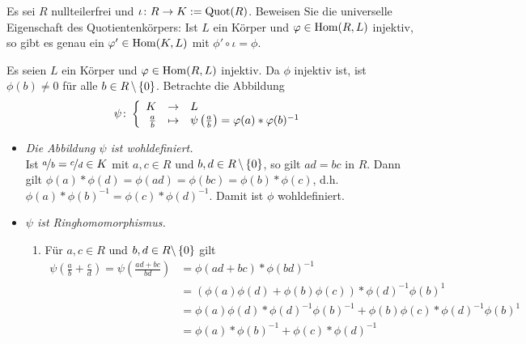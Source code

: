 \begin{exercisePage}
	\begin{exercise}
		Es sei $R$ nullteilerfrei und $\iota \colon R \to K:= \operatorname{Quot}(R)$. Beweisen Sie die universelle Eigenschaft des Quotientenkörpers: Ist $L$ ein Körper und $\varphi \in \operatorname{Hom}(R,L)$ injektiv, so gibt es genau ein $\varphi' \in \operatorname{Hom}(K,L)$ mit $\phi' \circ \iota = \phi$.
	\end{exercise}
	\begin{solution}
		Es seien $L$ ein Körper und $\varphi \in \operatorname{Hom}(R, L)$ injektiv. Da $\phi$ injektiv ist, ist $\phi(b) \neq 0$ für alle $b \in R\, \backslash \left\{ 0 \right\}$. Betrachte die Abbildung
		\begin{equation*}
			\psi \colon \left\lbrace \begin{array}{rcl} K & \to & L \\\frac{a}{b} & \mapsto & \psi \left(\frac{a}{b} \right) = \varphi(a) * \varphi(b)^{-1} \end{array} \right.
		\end{equation*}
		\begin{itemize}[leftmargin=*]
            \item \textit{Die Abbildung $\psi$ ist wohldefiniert.} \\
            Ist $\lfrac{a}{b} = \lfrac{c}{d} \in K$ mit $a,c \in R$ und $b,d \in R \, \backslash \left\{ 0 \right\}$, so gilt $ad = bc$ in $R$. Dann gilt $\phi(a) * \phi(d) = \phi(ad) = \phi(bc) = \phi(b) * \phi(c)$, d.h. $\phi(a) * \phi(b)^{-1} = \phi(c) * \phi(d)^{-1}$. Damit ist $\phi$ wohldefiniert.
            \item \textit{$\psi$ ist Ringhomomorphismus.}
            \begin{enumerate}[label=(\alph*)]
                \item Für $a,c \in R$ und $b,d \in R \backslash \left\{ 0 \right\}$ gilt
                \begin{equation*}
                    \begin{aligned}
                        \psi \left( \frac{a}{b} + \frac{c}{d} \right) 
                        = \psi \left( \frac{ad + bc}{bd} \right) 
                        &= \phi(ad + bc) * \phi(bd)^{-1}\\
                        &= \left( \phi(a)\phi(d) + \phi(b) \phi(c) \right) * \phi(d)^{-1} \phi(b)^{1} \\
                        &= \phi(a)\phi(d) * \phi(d)^{-1} \phi(b)^{-1} + \phi(b) \phi(c) * \phi(d)^{-1} \phi(b)^{1} \\
                        &= \phi(a) * \phi(b)^{-1} + \phi(c) * \phi(d)^{-1} \\

\end{aligned}
\end{equation*}
\end{enumerate}
\end{itemize}
\end{solution}
\end{exercisePage}
